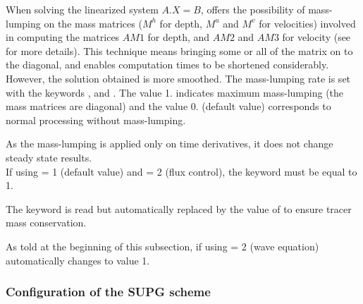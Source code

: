 
When solving the linearized system $A.X = B$,  offers the
possibility of mass-lumping on the mass matrices
($M^h$ for depth, $M^u$ and $M^v$ for velocities) involved in computing the
matrices $AM1$ for depth, and $AM2$ and $AM3$ for velocity
(see \cite{Hervouet2007} for more details).
This technique means bringing some or all of the matrix on to the diagonal,
and enables computation times to be shortened considerably.
However, the solution obtained is more smoothed.
The mass-lumping rate is set with the keywords ,
 and
.
The value 1. indicates maximum mass-lumping (the mass matrices are diagonal)
and the value 0. (default value) corresponds to normal processing
without mass-lumping.

As the mass-lumping is applied only on time derivatives,
it does not change steady state results.\\

If using  = 1 (default value)
and  = 2 (flux control),
the keyword  must be equal to 1.

The keyword  is read but automatically replaced
by the value of  to ensure tracer mass conservation.

As told at the beginning of this subsection, if using
 = 2 (wave equation) automatically
changes  to value 1.


\subsubsection{Configuration of the SUPG scheme}

